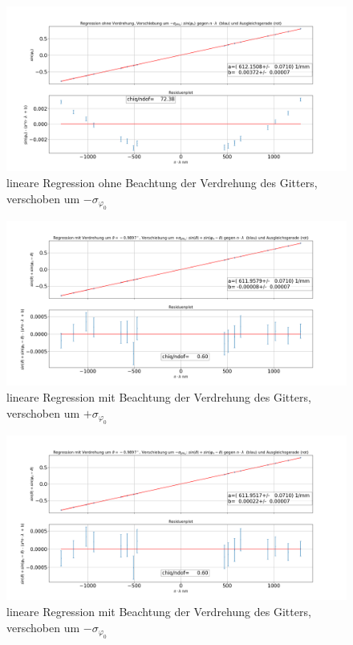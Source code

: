 \documentclass[a4paper, 11pt]{article}
\begin{document}
\begin{figure}[H]
	\hskip-2.5cm
	\includegraphics[scale=0.45]{./Bilder/Gitter_Regression_ohne_Verdrehung_-.png}
	\caption{lineare Regression ohne Beachtung der Verdrehung des Gitters, verschoben um $- \sigma_{\varphi_0}$}
	\label{pic:linReg_1_-}	
\end{figure}

\begin{figure}[H]
	\hskip-2.5cm
	\includegraphics[scale=0.45]{./Bilder/Gitter_Regression_mit_Verdrehung_+.png}
	\caption{lineare Regression mit Beachtung der Verdrehung des Gitters, verschoben um $+ \sigma_{\varphi_0}$}
	\label{pic:linReg_2_+}	
\end{figure}

\begin{figure}[H]
	\hskip-2.5cm
	\includegraphics[scale=0.45]{./Bilder/Gitter_Regression_mit_Verdrehung_-.png}
	\caption{lineare Regression mit Beachtung der Verdrehung des Gitters, verschoben um $- \sigma_{\varphi_0}$}
	\label{pic:linReg_2_-}	
\end{figure}


\newpage
\listoffigures
\listoftables
\end{document}
